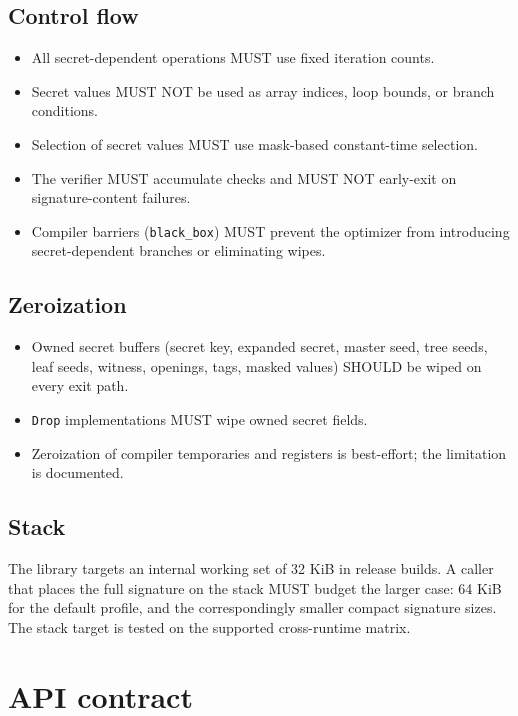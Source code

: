 \documentclass[11pt,a4paper]{article}
\begin{document}
\subsection{Control flow}

\begin{itemize}
  \item All secret-dependent operations MUST use fixed iteration counts.
  \item Secret values MUST NOT be used as array indices, loop bounds, or
        branch conditions.
  \item Selection of secret values MUST use mask-based constant-time
        selection.
  \item The verifier MUST accumulate checks and MUST NOT early-exit on
        signature-content failures.
  \item Compiler barriers (\texttt{black\_box}) MUST prevent the optimizer from
        introducing secret-dependent branches or eliminating wipes.
\end{itemize}

\subsection{Zeroization}

\begin{itemize}
  \item Owned secret buffers (secret key, expanded secret, master seed, tree
        seeds, leaf seeds, witness, openings, tags, masked values) SHOULD be
        wiped on every exit path.
  \item \texttt{Drop} implementations MUST wipe owned secret fields.
  \item Zeroization of compiler temporaries and registers is best-effort;
        the limitation is documented.
\end{itemize}

\subsection{Stack}

The library targets an internal working set of 32 KiB in release builds. A
caller that places the full signature on the stack MUST budget the larger
case: 64 KiB for the default profile, and the correspondingly smaller compact
signature sizes. The stack target is tested on the supported cross-runtime
matrix.

\section{API contract}
\end{document}
